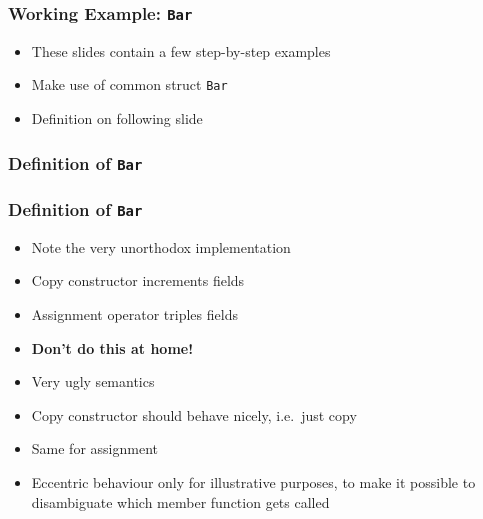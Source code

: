 \begin{frame}
  \frametitle{Working Example: {\tt Bar}}
  \begin{itemize}
    \item These slides contain a few step-by-step examples
    \item Make use of common struct {\tt Bar}
    \item Definition on following slide
  \end{itemize}
\end{frame}

\begin{frame}
  \frametitle{Definition of {\tt Bar}}
\end{frame}

\begin{frame}
  \frametitle{Definition of {\tt Bar}}
  \begin{itemize}
    \item Note the very unorthodox implementation
    \item Copy constructor increments fields
    \item Assignment operator triples fields
    \item \textbf{Don't do this at home!}
    \item Very ugly semantics
    \item Copy constructor should behave nicely, i.e.~just copy
    \item Same for assignment
    \item Eccentric behaviour only for illustrative purposes, to make it possible to disambiguate which member function gets called
  \end{itemize}
\end{frame}

